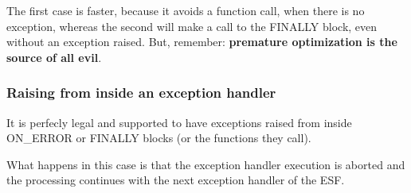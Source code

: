 The first case is faster, because it avoids a function call, when there is no exception, whereas the second will make a call to the {\ttfamily F\+I\+N\+A\+L\+LY} block, even without an exception raised. But, remember\+: {\bfseries premature optimization is the source of all evil}.

\subsubsection*{Raising from inside an exception handler}

It is perfecly legal and supported to have exceptions raised from inside {\ttfamily O\+N\+\_\+\+E\+R\+R\+OR} or {\ttfamily F\+I\+N\+A\+L\+LY} blocks (or the functions they call).

What happens in this case is that the exception handler execution is aborted and the processing continues with the next exception handler of the E\+SF. 